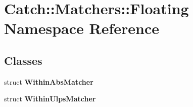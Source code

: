 \section{Catch\+::Matchers\+::Floating Namespace Reference}
\label{namespace_catch_1_1_matchers_1_1_floating}
\subsection*{Classes}
\begin{DoxyCompactItemize}
\item 
struct \textbf{ Within\+Abs\+Matcher}
\item 
struct \textbf{ Within\+Ulps\+Matcher}
\end{DoxyCompactItemize}
